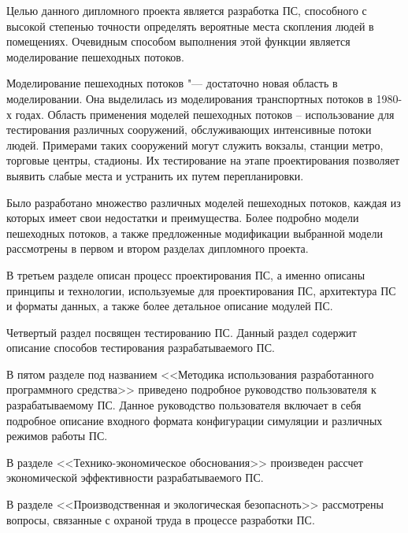 \label{sec:intro}

Целью данного дипломного проекта является разработка ПС, способного с высокой степенью точности определять вероятные места скопления людей в помещениях.
Очевидным способом выполнения этой функции является моделирование пешеходных потоков.

Моделирование пешеходных потоков "--- достаточно новая область в моделировании. Она выделилась из моделирования транспортных потоков в 1980-х годах.
Область применения моделей пешеходных потоков – использование для тестирования различных сооружений, обслуживающих интенсивные потоки людей.
Примерами таких сооружений могут служить вокзалы, станции метро, торговые центры, стадионы. Их тестирование на этапе проектирования позволяет выявить слабые места и устранить их путем перепланировки.

Было разработано множество различных моделей пешеходных потоков, каждая из которых имеет свои недостатки и преимущества.
Более подробно модели пешеходных потоков, а также предложенные модификации выбранной модели рассмотрены в первом и втором разделах дипломного проекта.

В третьем разделе описан процесс проектирования ПС, а именно описаны принципы и технологии, используемые для проектирования ПС, архитектура ПС и форматы данных, а также более детальное описание модулей ПС.

Четвертый раздел посвящен тестированию ПС. Данный раздел содержит описание способов тестирования разрабатываемого ПС.

В пятом разделе под названием <<Методика использования разработанного программного средства>> приведено подробное руководство пользователя к разрабатываемому ПС. Данное руководство пользователя включает в себя подробное описание входного формата конфигурации симуляции и различных режимов работы ПС.

В разделе <<Технико-экономическое обоснования>> произведен рассчет экономической эффективности разрабатываемого ПС.

В разделе <<Производственная и экологическая безопасноть>> рассмотрены вопросы, связанные с охраной труда в процессе разработки ПС.
